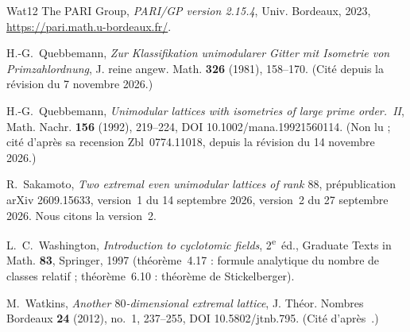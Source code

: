 \documentclass[11pt,a4paper]{amsart}
\theoremstyle{plain}
\theoremstyle{definition}
\numberwithin{equation}{section}
\begin{document}
\begin{thebibliography}{Wat12}
The PARI Group, \emph{PARI/GP version 2.15.4}, Univ. Bordeaux, 2023, \url{https://pari.math.u-bordeaux.fr/}.

H.-G.~Quebbemann, \emph{Zur Klassifikation unimodularer Gitter mit Isometrie von Primzahlordnung}, J. reine angew. Math. \textbf{326} (1981), 158--170. (Cité depuis la révision du 7 novembre 2026.)

H.-G.~Quebbemann, \emph{Unimodular lattices with isometries of large prime order.~II}, Math. Nachr. \textbf{156} (1992), 219--224, DOI 10.1002/mana.19921560114. (Non lu ; cité d'après sa recension Zbl~0774.11018, depuis la révision du 14 novembre 2026.)

R.~Sakamoto, \emph{Two extremal even unimodular lattices of rank $88$}, prépublication arXiv 2609.15633, version~1 du 14 septembre 2026, version~2 du 27 septembre 2026. Nous citons la version~2.

L.~C.~Washington, \emph{Introduction to cyclotomic fields}, 2\textsuperscript{e}~éd., Graduate Texts in Math. \textbf{83}, Springer, 1997 (théorème~4.17 : formule analytique du nombre de classes relatif ; théorème~6.10 : théorème de Stickelberger).

M.~Watkins, \emph{Another $80$-dimensional extremal lattice}, J. Théor. Nombres Bordeaux \textbf{24} (2012), no.~1, 237--255, DOI 10.5802/jtnb.795. (Cité d'après~\cite{Sak26}.)

\end{thebibliography}
\end{document}
